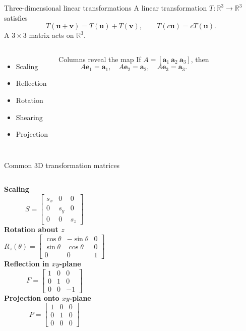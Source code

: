 \documentclass[aspectratio=169,11pt]{beamer}
\newcommand{\R}{\mathbb{R}}
\newcommand{\vect}[1]{\bm{#1}}
\begin{document}
\begin{frame}{Three-dimensional linear transformations}
A linear transformation $T:\R^3\to\R^3$ satisfies
\[
T(\vect u+\vect v)=T(\vect u)+T(\vect v),\qquad
T(c\vect u)=cT(\vect u).
\]
A $3\times3$ matrix acts on $\R^3$.
\begin{columns}[T]
\begin{itemize}
\item Scaling
\item Reflection
\item Rotation
\item Shearing
\item Projection
\end{itemize}
\begin{exampleblock}{Columns reveal the map}
If $A=[\vect a_1\ \vect a_2\ \vect a_3]$, then
\[
A\vect e_1=\vect a_1,\quad
A\vect e_2=\vect a_2,\quad
A\vect e_3=\vect a_3.
\]
\end{exampleblock}
\end{columns}
\end{frame}

\begin{frame}{Common 3D transformation matrices}
\small
\begin{columns}[T]
\textbf{Scaling}
\[
S=
\begin{bmatrix}
s_x&0&0\\0&s_y&0\\0&0&s_z
\end{bmatrix}
\]
\textbf{Rotation about $z$}
\[
R_z(\theta)=
\begin{bmatrix}
\cos\theta&-\sin\theta&0\\
\sin\theta&\cos\theta&0\\
0&0&1
\end{bmatrix}
\]
\textbf{Reflection in $xy$-plane}
\[
F=
\begin{bmatrix}
1&0&0\\0&1&0\\0&0&-1
\end{bmatrix}
\]
\textbf{Projection onto $xy$-plane}
\[
P=
\begin{bmatrix}
1&0&0\\0&1&0\\0&0&0
\end{bmatrix}
\]
\end{columns}
\end{frame}

\end{document}
